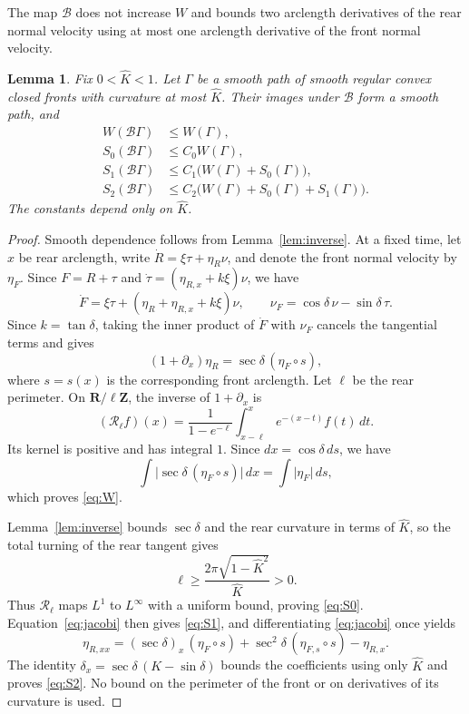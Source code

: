 \documentclass[11pt]{article}
\numberwithin{equation}{section}
\newtheorem{lemma}[theorem]{Lemma}
\newcommand{\R}{\mathbf{R}}
\newcommand{\Z}{\mathbf{Z}}
\newcommand{\Bmap}{\mathcal B}
\newcommand{\abs}[1]{\lvert #1\rvert}
\begin{document}
The map \(\Bmap\) does not increase \(W\) and bounds two arclength
derivatives of the rear normal velocity using at most one arclength
derivative of the front normal velocity.

\begin{lemma}\label{lem:jacobi}
Fix \(0<\widehat K<1\). Let \(\Gamma\) be a smooth path of smooth
regular convex closed fronts with curvature at most \(\widehat K\).
Their images under \(\Bmap\) form a smooth path, and
\begin{align}
  W(\Bmap\Gamma)&\leq W(\Gamma),\label{eq:W}\\
  S_0(\Bmap\Gamma)&\leq C_0W(\Gamma),\label{eq:S0}\\
  S_1(\Bmap\Gamma)&\leq C_1\bigl(W(\Gamma)+S_0(\Gamma)\bigr),\label{eq:S1}\\
  S_2(\Bmap\Gamma)&\leq C_2\bigl(W(\Gamma)+S_0(\Gamma)+S_1(\Gamma)\bigr).
    \label{eq:S2}
\end{align}
The constants depend only on \(\widehat K\).
\end{lemma}

\begin{proof}
Smooth dependence follows from Lemma~\ref{lem:inverse}. At a fixed time,
let \(x\) be rear arclength, write \(\dot R=\xi\tau+\eta_R\nu\), and
denote the front normal velocity by \(\eta_F\). Since \(F=R+\tau\) and
\(\dot\tau=(\eta_{R,x}+k\xi)\nu\), we have
\[
  \dot F=\xi\tau+(\eta_R+\eta_{R,x}+k\xi)\nu,\qquad
  \nu_F=\cos\delta\,\nu-\sin\delta\,\tau.
\]
Since \(k=\tan\delta\), taking the inner product of \(\dot F\) with \(\nu_F\)
cancels the tangential terms and gives
\begin{equation}\label{eq:jacobi}
  (1+\partial_x)\eta_R=\sec\delta\,(\eta_F\circ s),
\end{equation}
where \(s=s(x)\) is the corresponding front arclength. Let \(\ell\) be
the rear perimeter. On \(\R/\ell\Z\), the inverse of
\(1+\partial_x\) is
\[
  (\mathcal R_\ell f)(x)=\frac1{1-e^{-\ell}}
      \int_{x-\ell}^x e^{-(x-t)}f(t)\,dt.
\]
Its kernel is positive and has integral \(1\). Since \(dx=\cos\delta\,ds\),
we have
\[
  \int\abs{\sec\delta\,(\eta_F\circ s)}\,dx
  =\int\abs{\eta_F}\,ds,
\]
which proves \eqref{eq:W}.

Lemma~\ref{lem:inverse} bounds \(\sec\delta\) and the rear curvature in
terms of \(\widehat K\), so the total turning of the rear tangent gives
\[
  \ell\geq\frac{2\pi\sqrt{1-\widehat K^2}}{\widehat K}>0.
\]
Thus \(\mathcal R_\ell\) maps \(L^1\) to \(L^\infty\) with a uniform
bound, proving \eqref{eq:S0}. Equation~\eqref{eq:jacobi} then gives
\eqref{eq:S1}, and differentiating \eqref{eq:jacobi} once yields
\[
  \eta_{R,xx}=(\sec\delta)_x\,(\eta_F\circ s)
       +\sec^2\delta\,(\eta_{F,s}\circ s)-\eta_{R,x}.
\]
The identity \(\delta_x=\sec\delta\,(K-\sin\delta)\) bounds the coefficients
using only \(\widehat K\) and proves \eqref{eq:S2}. No bound on the
perimeter of the front or on derivatives of its curvature is used.
\end{proof}
\end{document}
